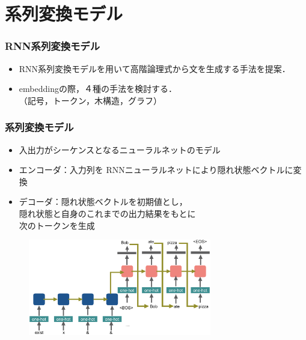 \documentclass[dvipdfmx]{beamer}
\begin{document}
\section{系列変換モデル}
\begin{frame}
\frametitle{RNN系列変換モデル}
\begin{center}
\end{center}

\begin{itemize}
  \item {\color{berry}RNN系列変換モデル}を用いて高階論理式から文を生成する手法を提案．
  \item embeddingの際，４種の手法を検討する．\\（記号，トークン，木構造，グラフ）　
\end{itemize}


\end{frame}



\begin{frame}
\frametitle{系列変換モデル\citep{seq2seq} }
\begin{itemize}
  \item 入出力がシーケンスとなるニューラルネットのモデル
  \item エンコーダ：入力列を RNNニューラルネットにより隠れ状態ベクトルに変換
  \item デコーダ：隠れ状態ベクトルを初期値とし，\\隠れ状態と自身のこれまでの出力結果をもとに\\次のトークンを生成
\end{itemize}

\begin{center}
\begin{figure}[h]
	\includegraphics[width=8cm]{learn_model.png}
        \label{fig:seq2seq}
\end{figure}
\end{center}

\end{frame}
\end{document}
